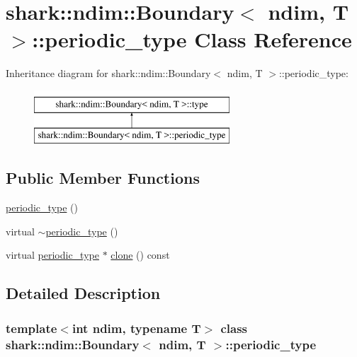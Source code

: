 \hypertarget{classshark_1_1ndim_1_1_boundary_1_1periodic__type}{}\section{shark\+:\+:ndim\+:\+:Boundary$<$ ndim, T $>$\+:\+:periodic\+\_\+type Class Reference}
\label{classshark_1_1ndim_1_1_boundary_1_1periodic__type}
Inheritance diagram for shark\+:\+:ndim\+:\+:Boundary$<$ ndim, T $>$\+:\+:periodic\+\_\+type\+:\begin{figure}[H]
\begin{center}
\leavevmode
\includegraphics[height=2.000000cm]{classshark_1_1ndim_1_1_boundary_1_1periodic__type}
\end{center}
\end{figure}
\subsection*{Public Member Functions}
\begin{DoxyCompactItemize}
\item 
\hyperlink{classshark_1_1ndim_1_1_boundary_1_1periodic__type_a2a2361be7dd3d056049d46160c7dbafa}{periodic\+\_\+type} ()
\item 
virtual \hyperlink{classshark_1_1ndim_1_1_boundary_1_1periodic__type_a0a83253b5e97de76c244b2a971416a19}{$\sim$periodic\+\_\+type} ()
\item 
virtual \hyperlink{classshark_1_1ndim_1_1_boundary_1_1periodic__type}{periodic\+\_\+type} $\ast$ \hyperlink{classshark_1_1ndim_1_1_boundary_1_1periodic__type_a54904c3d305d26abe8cc8f4b85d9d7e0}{clone} () const
\end{DoxyCompactItemize}


\subsection{Detailed Description}
\subsubsection*{template$<$int ndim, typename T$>$\newline
class shark\+::ndim\+::\+Boundary$<$ ndim, T $>$\+::periodic\+\_\+type}



